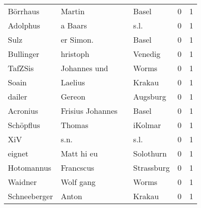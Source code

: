\begin{tabular}{llllrr}
                 Börrhaus &                             Martin &             &                                       Basel &          0 &         1 \\
                 Adolphus &                            a Baars &             &                                        s.l. &          0 &         1 \\
                     Sulz &                          er Simon. &             &                                       Basel &          0 &         1 \\
                Bullinger &                           hristoph &             &                                     Venedig &          0 &         1 \\
                  TafZSis &                       Johannes und &             &                                       Worms &          0 &         1 \\
                    Soain &                            Laelius &             &                                      Krakau &          0 &         1 \\
                   dailer &                             Gereon &             &                                    Augsburg &          0 &         1 \\
                 Acronius &                   Frisius Johannes &             &                                       Basel &          0 &         1 \\
                Schöpflus &                             Thomas &             &                                     iKolmar &          0 &         1 \\
                      XiV &                               s.n. &             &                                        s.l. &          0 &         1 \\
                   eignet &                         Matt hi eu &             &                                   Solothurn &          0 &         1 \\
               Hotomannus &                          Francscus &             &                                  Strassburg &          0 &         1 \\
                  Waidner &                          Wolf gang &             &                                       Worms &          0 &         1 \\
             Schneeberger &                              Anton &             &                                      Krakau &          0 &         1 \\

\end{tabular}
